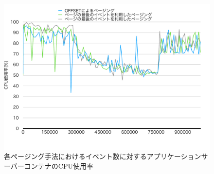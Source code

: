\documentclass[../../../../../main]{subfiles}
\begin{document}
    \begin{figure}[H]
        \centering
        \includegraphics[width=12cm]{graph}
        \caption{各ページング手法におけるイベント数に対するアプリケーションサーバーコンテナのCPU使用率}
        \label{fig:each-paging-app-cpu-app_1_1024-db_1_1024}
    \end{figure}
\end{document}
